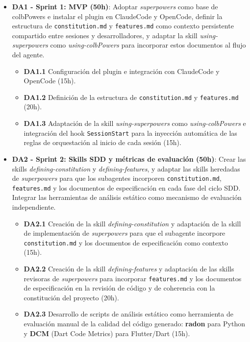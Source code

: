 \documentclass[11pt, letterpaper]{article}
\begin{document}
\begin{itemize}
    \item \textbf{DA1 - Sprint 1: MVP (50h)}: Adoptar \textit{superpowers} como base de colbPowers e instalar el plugin en ClaudeCode y OpenCode, definir la estructura de \texttt{constitution.md} y \texttt{features.md} como contexto persistente compartido entre sesiones y desarrolladores, y adaptar la skill \textit{using-superpowers} como \textit{using-colbPowers} para incorporar estos documentos al flujo del agente.
    \begin{itemize}
        \item \textbf{DA1.1} Configuración del plugin e integración con ClaudeCode y OpenCode (15h).
        \item \textbf{DA1.2} Definición de la estructura de \texttt{constitution.md} y \texttt{features.md} (20h).
        \item \textbf{DA1.3} Adaptación de la skill \textit{using-superpowers} como \textit{using-colbPowers} e integración del hook \texttt{SessionStart} para la inyección automática de las reglas de orquestación al inicio de cada sesión (15h).
    \end{itemize}

    \item \textbf{DA2 - Sprint 2: Skills SDD y métricas de evaluación (50h)}: Crear las skills \textit{defining-constitution} y \textit{defining-features}, y adaptar las skills heredadas de \textit{superpowers} para que los subagentes incorporen \texttt{constitution.md}, \texttt{features.md} y los documentos de especificación en cada fase del ciclo SDD. Integrar las herramientas de análisis estático como mecanismo de evaluación independiente.
    \begin{itemize}
        \item \textbf{DA2.1} Creación de la skill \textit{defining-constitution} y adaptación de la skill de implementación de \textit{superpowers} para que el subagente incorpore \texttt{constitution.md} y los documentos de especificación como contexto (15h).
        \item \textbf{DA2.2} Creación de la skill \textit{defining-features} y adaptación de las skills revisoras de \textit{superpowers} para incorporar \texttt{features.md} y los documentos de especificación en la revisión de código y de coherencia con la constitución del proyecto (20h).
        \item \textbf{DA2.3} Desarrollo de scripts de análisis estático como herramienta de evaluación manual de la calidad del código generado: \textbf{radon} para Python y \textbf{DCM} (Dart Code Metrics) para Flutter/Dart (15h).
    \end{itemize}
    

\end{itemize}
\end{document}
